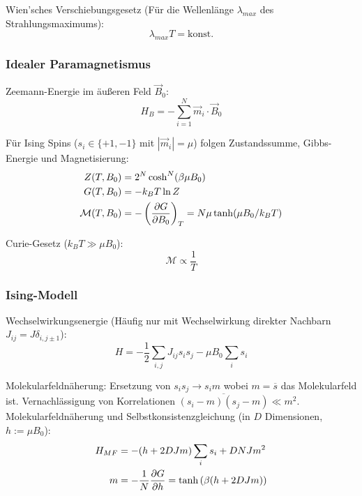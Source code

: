 \documentclass[11pt]{article}
\numberwithin{equation}{section}
\begin{document}
        Wien'sches Verschiebungsgesetz (Für die Wellenlänge $\lambda_{max}$ des Strahlungsmaximums):
        \begin{equation}
          \lambda_{max} T = \mathrm{konst}.
        \end{equation}

      \subsubsection{Idealer Paramagnetismus}
        Zeemann-Energie im äußeren Feld $\vec{B}_0$:
        \begin{equation}
          H_B = -\sum_{i=1}^N \vec{m}_i \cdot \vec{B}_0
        \end{equation}

        Für Ising Spins ($s_i\in\lbrace +1, -1\rbrace$ mit $|\vec{m}_i| = \mu$) folgen Zustandssumme, Gibbs-Energie und Magnetisierung:
        \begin{equation}
          \begin{aligned}
            Z(T,B_0) &= 2^N \cosh^N (\beta\mu B_0) \\
            G(T,B_0) &= -k_B T \ln Z \\
            \mathcal{M}(T,B_0) &= -\left(\frac{\partial G}{\partial B_0}\right)_T = N\mu \tanh(\mu B_0 /k_B T)
          \end{aligned}
        \end{equation}

        Curie-Gesetz ($k_B T \gg \mu B_0$):
        \begin{equation}
          \mathcal{M} \propto \frac{1}{T}
        \end{equation}

      \subsubsection{Ising-Modell}
        Wechselwirkungsenergie (Häufig nur mit Wechselwirkung direkter Nachbarn $J_{ij} = J \delta_{i,j\pm 1}$):
        \begin{equation}
          H = -\frac{1}{2}\sum_{i,j} J_{ij} s_i s_j -\mu B_0 \sum_i s_i
        \end{equation}

        Molekularfeldnäherung: \newline Ersetzung von $s_i s_j \rightarrow s_i m$ wobei $m = \overline{s}$ das Molekularfeld ist. Vernachlässigung von Korrelationen $\overline{(s_i-m)(s_j-m)}\ll m^2$. \nl
        Molekularfeldnäherung und Selbstkonsistenzgleichung (in $D$ Dimensionen, $h:=\mu B_0$):
        \begin{equation}
          \begin{aligned}
            H_{MF} &= -(h + 2 D J m) \sum_i s_i + D N J m^2 \\
            m &= -\frac{1}{N}\frac{\partial G}{\partial h} = \tanh\left({\beta(h + 2 D J m)}\right)
          \end{aligned}
        \end{equation}
\end{document}
